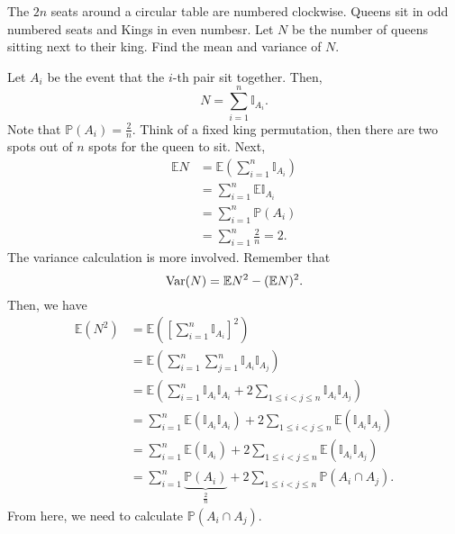 \begin{eg}
	The \( 2n \) seats around a circular table are numbered clockwise. Queens sit in odd numbered seats and Kings in even numbesr. Let \( N \) be the number of queens sitting next to their king. Find the mean and variance of \( N \).
\end{eg}
\begin{explanation}
	Let \( A_i \) be the event that the \( i \)-th pair sit together. Then, \[
		N = \sum_{i=1}^{n} \mathbb{I}_{A_i}
	.\] Note that \( \mathbb{P}(A_i) =\frac{2}{n}\). Think of a fixed king permutation, then there are two spots out of \( n \) spots for the queen to sit. Next, 
	\begin{align*}
		\mathbb{E}N &= \mathbb{E}\left( \sum_{i=1}^{n} \mathbb{I}_{A_i} \right) \\
		&= \sum_{i=1}^{n} \mathbb{E} \mathbb{I}_{A_i} \\
		&= \sum_{i=1}^{n} \mathbb{P}(A_i) \\
		&= \sum_{i=1}^{n} \frac{2}{n} = 2 
	.\end{align*}
	The variance calculation is more involved. Remember that \[
		\operatorname{Var}(N) = \mathbb{E}N^{2} - (\mathbb{E}N)^{2} 
	.\] Then, we have 
	\begin{align*}
		\mathbb{E}(N^{2} ) &= \mathbb{E}\left( \left[ \sum_{i=1}^{n} \mathbb{I}_{A_i} \right]^{2}  \right) \\
		&= \mathbb{E}\left( \sum_{i=1}^{n} \sum_{j=1}^{n} \mathbb{I}_{A_i}\mathbb{I}_{A_j} \right)  \\
		&= \mathbb{E}\left( \sum_{i=1}^{n} \mathbb{I}_{A_i} \mathbb{I}_{A_i} + 2 \sum_{1 \le i<j\le n} \mathbb{I}_{A_i} \mathbb{I}_{A_j} \right)  \\
		&= \sum_{i=1}^{n} \mathbb{E}(\mathbb{I}_{A_i}\mathbb{I}_{A_i}) + 2 \sum_{1 \le i<j\le n} \mathbb{E}(\mathbb{I}_{A_i}\mathbb{I}_{A_j}) \\
		&= \sum_{i=1}^{n} \mathbb{E}(\mathbb{I}_{A_i}) + 2 \sum_{1 \le i<j\le n} \mathbb{E}(\mathbb{I}_{A_i}\mathbb{I}_{A_j}) \\
		&= \sum_{i=1}^{n} \underbrace{\mathbb{P}(A_i)}_{\frac{2}{n}} + 2 \sum_{1 \le i<j\le n} \mathbb{P}(A_i \cap A_j) 
	.\end{align*}
	From here, we need to calculate \( \mathbb{P}(A_i \cap A_j) \).
\end{explanation}
